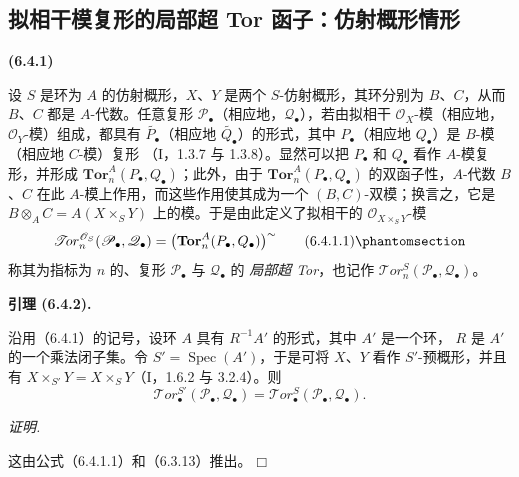 \documentclass[UTF8,fontset=none,11pt,oneside,openany]{ctexbook}
\providecommand{\square}{\mdlgwhtsquare}
\newenvironment{env}[1][]{%
  \par\medskip\noindent\textbf{(#1)}\ %
}{\par}
\newenvironment{proof}{%
  \par\smallskip\noindent\textit{证明.}\ %
}{\hfill$\square$\par}
\let\EGAOriginalLabel\label
\renewcommand{\label}[1]{\phantomsection\EGAOriginalLabel{#1}}
\newenvironment{namedtheorem}[2][]{%
  \par\medskip\noindent\textbf{#2 (#1).}\ %
}{\par}
\begin{document}
\subsection{拟相干模复形的局部超 Tor 函子：仿射概形情形}

\begin{env}[6.4.1]
设 $S$ 是环为 $A$ 的仿射概形，$X$、$Y$ 是两个 $S$-仿射概形，其环分别为
$B$、$C$，从而 $B$、$C$ 都是 $A$-代数。任意复形
$\mathscr P_\bullet$（相应地，$\mathscr Q_\bullet$），若由拟相干
$\mathscr O_X$-模（相应地，$\mathscr O_Y$-模）组成，都具有
$\widetilde{P_\bullet}$（相应地 $\widetilde{Q_\bullet}$）的形式，其中
$P_\bullet$（相应地 $Q_\bullet$）是 $B$-模（相应地 $C$-模）复形
（I，1.3.7 与 1.3.8）。显然可以把 $P_\bullet$ 和 $Q_\bullet$ 看作
$A$-模复形，并形成 $\mathbf{Tor}_n^A(P_\bullet,Q_\bullet)$；此外，由于
$\mathbf{Tor}_n^A(P_\bullet,Q_\bullet)$ 的双函子性，$A$-代数 $B$、$C$ 在此
$A$-模上作用，而这些作用使其成为一个 $(B,C)$-双模；换言之，它是
$B\otimes_A C=A(X\times_S Y)$ 上的模。于是由此定义了拟相干的
$\mathscr O_{X\times_S Y}$-模
\[
  \mathscr{T}\!or_n^{\mathscr O_S}(\mathscr P_\bullet,\mathscr Q_\bullet)
  =\bigl(\mathbf{Tor}_n^A(P_\bullet,Q_\bullet)\bigr)^{\sim}
  \tag{6.4.1.1}\label{III.6.4.1.1-fr}
\]
称其为指标为 $n$ 的、复形 $\mathscr P_\bullet$ 与 $\mathscr Q_\bullet$ 的
\emph{局部超 Tor}，也记作
$\mathscr{T}\!or_n^S(\mathscr P_\bullet,\mathscr Q_\bullet)$。
\end{env}

\begin{namedtheorem}[6.4.2]{引理}
沿用（6.4.1）的记号，设环 $A$ 具有 $R^{-1}A'$ 的形式，其中 $A'$ 是一个环，
$R$ 是 $A'$ 的一个乘法闭子集。令 $S'=\operatorname{Spec}(A')$，于是可将
$X$、$Y$ 看作 $S'$-预概形，并且有
$X\times_{S'}Y=X\times_S Y$（I，1.6.2 与 3.2.4）。则
\[
  \mathscr{T}\!or_\bullet^{S'}(\mathscr P_\bullet,\mathscr Q_\bullet)
  =\mathscr{T}\!or_\bullet^S(\mathscr P_\bullet,\mathscr Q_\bullet).
\]
\end{namedtheorem}

\begin{proof}
这由公式（6.4.1.1）和（6.3.13）推出。
\end{proof}
\end{document}
